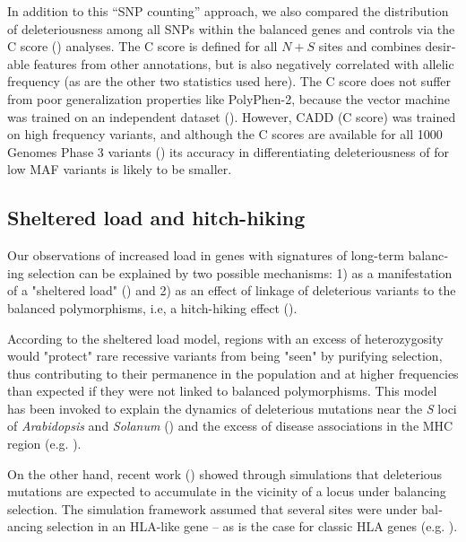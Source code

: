 \begin{refsection}
\begin{otherlanguage}{english}
In addition to this \enquote{SNP counting} approach, we also compared the distribution of deleteriousness among all SNPs within the balanced genes and controls via the C score (\cite{Kircher2014}) analyses. The C score is defined for all $N+S$ sites and combines desirable features from other annotations, but is also negatively correlated with allelic frequency (as are the other two statistics used here). The C score does not suffer from poor generalization properties like PolyPhen-2, because the vector machine was trained on an independent dataset (\cite{Grimm2015,Kircher2014}). However, CADD (C score) was trained on high frequency variants, and although the C scores are available for all 1000 Genomes Phase 3 variants (\cite{Kircher2014}) its accuracy in differentiating deleteriousness of for low MAF variants is likely to be  smaller.

\subsection{Sheltered load and hitch-hiking}
Our observations of increased load in genes with signatures of long-term balancing selection can be explained by two possible mechanisms: 1) as a manifestation of a "sheltered load" (\cite{VanOosterhout2009}) and 2) as an effect of linkage of deleterious variants to the balanced polymorphisms, i.e, a hitch-hiking effect (\cite{Mendes2013,Lenz2016}). 

According to the sheltered load model, regions with an excess of heterozygosity would "protect" rare recessive variants from being "seen" by purifying selection, thus contributing to their permanence in the population and at higher frequencies than expected if they were not linked to balanced polymorphisms. This model has been invoked to explain the dynamics of deleterious mutations near the \emph{S} loci of \emph{Arabidopsis} and \emph{Solanum} (\cite{Stone2004,Roux2013}) and the excess of disease associations in the MHC region (e.g. \cite{VanOosterhout2009}).

On the other hand, recent work (\cite{Lenz2016}) showed through simulations  that deleterious mutations are expected to accumulate in the vicinity of a locus under balancing selection. The simulation framework assumed that several sites were under balancing selection in an HLA-like gene -- as is the case for classic HLA genes (e.g. \cite{Hughes1988,Yang2002a,Bitarello2015}).



\end{otherlanguage}
\end{refsection}
